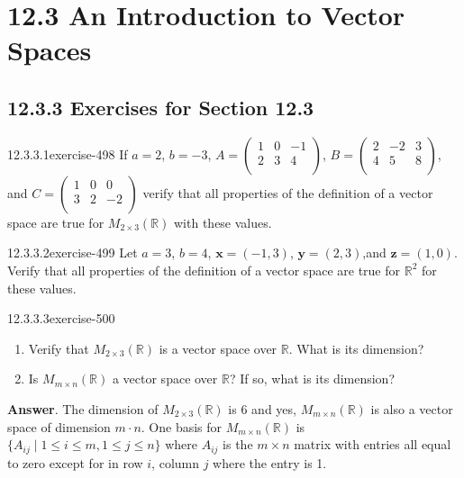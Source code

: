 \documentclass[twoside,10pt,]{book}
\numberwithin{equation}{section}
\renewcommand{\vec}[1]{\mathbf{#1}}
\begin{document}
\section*{12.3 An Introduction to Vector Spaces}
\subsection*{12.3.3 Exercises for Section 12.3}
\begin{divisionsolution}{12.3.3.1}{}{exercise-498}%
\hypertarget{p-4519}{}%
If \(a = 2\), \(b = -3\), \(A=\left(
\begin{array}{ccc}
1 & 0 & -1 \\
2 & 3 & 4 \\
\end{array}
\right)\),    \(B=\left(
\begin{array}{ccc}
2 & -2 & 3 \\
4 & 5 & 8 \\
\end{array}
\right)\),  and \(C=\left(
\begin{array}{ccc}
1 & 0 & 0 \\
3 & 2 & -2 \\
\end{array}
\right)\) verify that all properties of the definition of a vector space are true for \(M_{2\times 3}(\mathbb{R})\) with these values.%
\end{divisionsolution}%
\begin{divisionsolution}{12.3.3.2}{}{exercise-499}%
\hypertarget{p-4520}{}%
Let \(a = 3\), \(b = 4\), \(\vec{x}\pmb = (-1, 3)\), \(\vec{y} = (2, 3)\),and \(\vec{z} = (1, 0)\). Verify that all properties of the definition of a vector space are true for \(\mathbb{R}^2\) for these values.%
\end{divisionsolution}%
\begin{divisionsolution}{12.3.3.3}{}{exercise-500}%
\hypertarget{p-4521}{}%
\leavevmode%
\begin{enumerate}[label=(\alph*)]
\item\hypertarget{li-2068}{}\hypertarget{p-4522}{}%
Verify that \(M_{2\times 3}(\mathbb{R})\) is a vector space over \(\mathbb{R}\).  What is its dimension?%
\item\hypertarget{li-2069}{}\hypertarget{p-4523}{}%
Is \(M_{m\times n}(\mathbb{R})\) a vector space over \(\mathbb{R}\)?  If so, what is its dimension?%
\end{enumerate}
%
\par\smallskip%
\noindent\textbf{Answer}.\quad%
\hypertarget{p-4524}{}%
The dimension of \(M_{2\times 3}(\mathbb{R})\) is 6 and yes, \(M_{m\times n}(\mathbb{R})\) is also a vector space of dimension \(m \cdot n\).   One basis for \(M_{m\times n}(\mathbb{R})\) is \(\{A_{ij} \mid 1 \leq i \leq m, 1 \leq j \leq n\}\) where \(A_{ij}\) is the \(m\times n\) matrix with entries all equal to zero except for in row \(i\), column \(j\) where the entry is 1.%
\end{divisionsolution}%
\end{document}
